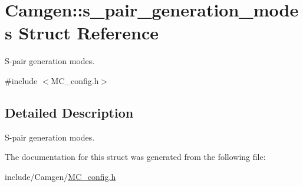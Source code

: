 \hypertarget{a00494}{}\section{Camgen\+:\+:s\+\_\+pair\+\_\+generation\+\_\+modes Struct Reference}
\label{a00494}


S-\/pair generation modes.  




{\ttfamily \#include $<$M\+C\+\_\+config.\+h$>$}



\subsection{Detailed Description}
S-\/pair generation modes. 

The documentation for this struct was generated from the following file\+:\begin{DoxyCompactItemize}
\item 
include/\+Camgen/\hyperlink{a00690}{M\+C\+\_\+config.\+h}\end{DoxyCompactItemize}
